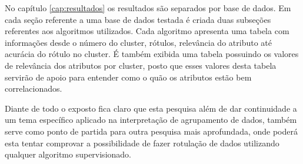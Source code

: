 No capítulo \ref{cap:resultados} os resultados são separados por base de dados. Em cada seção referente a uma base de dados testada é criada duas subseções referentes aos algoritmos utilizados. Cada algoritmo apresenta uma tabela com informações desde o número do cluster, rótulos, relevância do atributo até acurácia do rótulo no cluster. É também exibida uma tabela possuindo os valores de relevância dos atributos por cluster, posto que esses valores desta tabela servirão de apoio para entender como o quão os atributos estão bem correlacionados.


Diante de todo o exposto fica claro que esta pesquisa além de dar continuidade a um tema específico aplicado na interpretação de agrupamento de dados, também serve como ponto de partida para outra pesquisa mais aprofundada, onde poderá esta tentar comprovar a possibilidade de fazer rotulação de dados utilizando qualquer algoritmo supervisionado.




